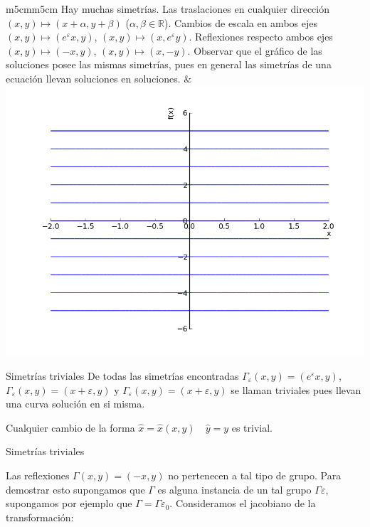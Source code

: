 \documentclass{article}
\newcommand{\rr}{\mathbb{R}}
\renewcommand{\emph}[1]{\textcolor[rgb]{1,0,0}{#1}}
\renewcommand{\epsilon}{\varepsilon}
\newcounter{ejemplo_cont}
\begin{document}
 \begin{tabular}{m{5cm}m{5cm}}
 Hay muchas simetrías. Las traslaciones en cualquier dirección $(x,y)\mapsto (x+\alpha ,y+\beta)$ ($\alpha,\beta\in\rr$). Cambios de escala en ambos ejes  $(x,y)\mapsto (e^{\epsilon}x,y)$, $(x,y)\mapsto (x,e^{\epsilon}y)$. Reflexiones respecto ambos ejes  $(x,y)\mapsto (-x,y)$, $(x,y)\mapsto (x,-y)$.  Observar que el gráfico de las soluciones posee las mismas simetrías, pues en general \emph{las simetrías de una ecuación llevan soluciones en soluciones}.
& 
\includegraphics[scale=.3]{imagenes/sol_trivial.png}\\
\end{tabular}



{Simetrías triviales}
 De todas las simetrías encontradas $\Gamma_{\epsilon}(x,y)=(e^{\epsilon}x,y)$, $\Gamma_{\epsilon}(x,y)=(x+\epsilon,y)$ y  $\Gamma_{\epsilon}(x,y)=(x+\epsilon,y)$ se llaman \emph{triviales} pues llevan una curva solución en si misma.

 Cualquier cambio de la forma $\hat{x}=\hat{x}(x,y)\quad \hat{y}=y$ es trivial.

 \fbox{\begin{minipage}{\linewidth}\emph{Estamos interesados en hallar grupos de Lie uniparamétricos de simetrías no triviales.}
    \end{minipage}
  }



{Simetrías triviales}


 Las reflexiones $\Gamma(x,y)=(-x,y)$  no pertenecen a tal tipo de  grupo. Para demostrar esto supongamos que  $\Gamma$ es alguna instancia de un tal grupo $\Gamma{\epsilon}$, supongamos por ejemplo que $\Gamma=\Gamma{\epsilon_0}$.  Consideramos el jacobiano de la transformación:
\end{document}
